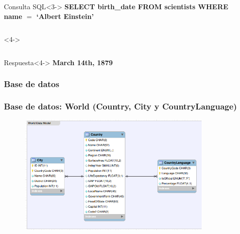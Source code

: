 \begin{frame}
  \begin{exampleblock}{Consulta SQL}<3->
\textbf{{\color{purple}SELECT} birth\_date \newline
      {\color{purple}FROM} scientists\newline
      {\color{purple}WHERE} name $=$ {\color{green}`Albert Einstein'}
      }
  \end{exampleblock}
  \begin{columns}<4->
      \begin{column}{.5\textwidth}
      \end{column}
      \begin{column}{.1\textwidth}
      \end{column}
      \begin{column}{.3\textwidth}
      \end{column}
      \begin{column}{.5\textwidth}

      \end{column}
  \end{columns}

  \begin{alertblock}{Respuesta}<4->
      \textbf{March 14th, 1879}
  \end{alertblock}

\end{frame}



\subsubsection*{Base de datos}\fontsize{9.5pt}{8.2}\selectfont
\begin{frame}
\frametitle{Base de datos: World (Country, City y CountryLanguage)}
\begin{figure}
    \includegraphics[width=9.823cm,height=6.004cm]{graficos/fuentes/world-db.png}
\end{figure}
\end{frame}



